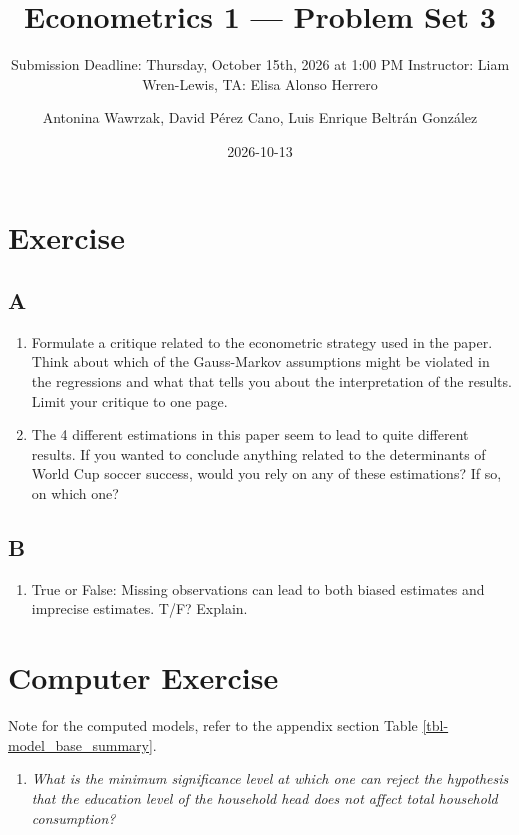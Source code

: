 \documentclass[
  letterpaper,
  DIV=11,
  numbers=noendperiod]{scrartcl}
\title{Econometrics 1 --- Problem Set 3}
\subtitle{Submission Deadline: Thursday, October 15th, 2026 at 1:00 PM
\textbar{} Instructor: Liam Wren-Lewis, TA: Elisa Alonso Herrero}
\author{Antonina Wawrzak, David Pérez Cano, Luis Enrique Beltrán
González}
\date{2026-10-13}
\providecommand{\tightlist}{%
  \setlength{\itemsep}{0pt}\setlength{\parskip}{0pt}}
\begin{document}
\maketitle


\section{Exercise}\label{exercise}

\subsection{A}\label{a}

\begin{enumerate}
\def\labelenumi{\arabic{enumi}.}
\item
  Formulate a critique related to the econometric strategy used in the
  paper. Think about which of the Gauss-Markov assumptions might be
  violated in the regressions and what that tells you about the
  interpretation of the results. Limit your critique to one page.
\item
  The 4 different estimations in this paper seem to lead to quite
  different results. If you wanted to conclude anything related to the
  determinants of World Cup soccer success, would you rely on any of
  these estimations? If so, on which one?
\end{enumerate}

\subsection{B}\label{b}

\begin{enumerate}
\def\labelenumi{\arabic{enumi}.}
\tightlist
\item
  True or False: Missing observations can lead to both biased estimates
  and imprecise estimates. T/F? Explain.
\end{enumerate}

\section{Computer Exercise}\label{computer-exercise}

Note for the computed models, refer to the appendix section Table
\ref{tbl-model_base_summary}.

\begin{enumerate}
\def\labelenumi{\arabic{enumi}.}
\tightlist
\item
  \emph{What is the minimum significance level at which one can reject
  the hypothesis that the education level of the household head does not
  affect total household consumption?}
\end{enumerate}
\end{document}
